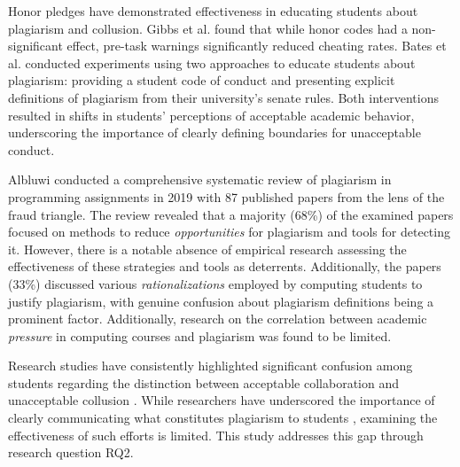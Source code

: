Honor pledges have demonstrated effectiveness in educating students about plagiarism and collusion. Gibbs et al. \cite{10.1145/2724660.2728663} found that while honor codes had a non-significant effect, pre-task warnings significantly reduced cheating rates. Bates et al.\cite{bates2016academic} conducted experiments using two approaches to educate students about plagiarism: providing a student code of conduct and presenting explicit definitions of plagiarism from their university's senate rules. Both interventions resulted in shifts in students' perceptions of acceptable academic behavior, underscoring the importance of clearly defining boundaries for unacceptable conduct.

Albluwi \cite{10.1145/3371156} conducted a comprehensive systematic review of plagiarism in programming assignments in 2019 with 87 published papers from the lens of the fraud triangle. The review revealed that a majority (68\%) of the examined papers focused on methods to reduce \textit{opportunities} for plagiarism and tools for detecting it. However, there is a notable absence of empirical research assessing the effectiveness of these strategies and tools as deterrents. Additionally, the papers (33\%) discussed various \textit{rationalizations} employed by computing students to justify plagiarism, with genuine confusion about plagiarism definitions being a prominent factor. Additionally, research on the correlation between academic \textit{pressure} in computing courses and plagiarism was found to be limited.

Research studies have consistently highlighted significant confusion among students regarding the distinction between acceptable collaboration and unacceptable collusion \cite{10.1145/2591708.2591755, 10.1145/2632320.2632342, Joy2011SourceCP}. While researchers have underscored the importance of clearly communicating what constitutes plagiarism to students \cite{10.1145/1595496.1562900, 10.1145/3160489.3160502, 10.1145/1734263.1734365, 10.1145/3024906.3024910}, examining the effectiveness of such efforts is limited. This study addresses this gap through research question RQ2.


